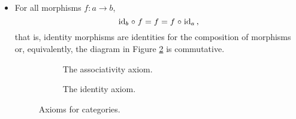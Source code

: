 \begin{definition}
\begin{itemize}
  \item
    For all morphisms $f: a \to b$,
    \begin{equation}
      \label{eq:category-identity}
      \operatorname{id}_{b} \mathrel{\circ} f = f = f \mathrel{\circ} \operatorname{id}_{a}
      \text{,}
    \end{equation}
    that is, identity morphisms are identities for the composition of
    morphisms or, equivalently, the diagram in Figure
    \ref{fig:category-identity} is commutative.

    \begin{figure}[htb]
      \begin{center}
        \begin{subfigure}[t]{0.45\linewidth}
          \begin{center}
          \end{center}
          \caption{The associativity axiom.}
          \label{fig:category-associativity}
        \end{subfigure}
        \begin{subfigure}[t]{0.45\linewidth}
          \begin{center}
          \end{center}
          \caption{The identity axiom.}
          \label{fig:category-identity}
        \end{subfigure}
      \end{center}
      \caption{Axioms for categories.}
      \label{fig:category-axioms}
    \end{figure}

  \end{itemize}

\end{definition}

